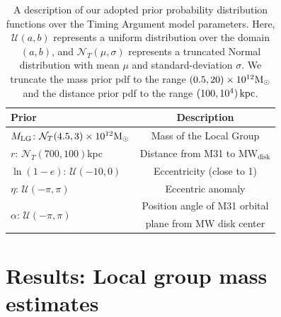 \documentclass[twocolumn]{aastex631}
\newcommand{\kc}[1]{\textcolor{pink}{\textbf{#1}} }
\newcommand{\mlg}{\ensuremath{M_{\rm LG}}}
\newcommand{\mwdisk}{\ensuremath{\textrm{MW}_\textrm{disk}}}
\begin{document}
\begin{table}
  \centering
  \begin{tabular}{lc}
  \hline\hline
  Prior  & Description \\\hline
  \mlg: $\mathcal{N}_T(4.5,3)\times10^{12}\mathrm{M}_\odot$ & Mass of the Local Group\\
  $r$: $\mathcal{N}_T(700,100)$kpc & Distance from M31 to $\mwdisk$\\
  $\ln(1-e)$: $\mathcal{U}(-10,0)$ & Eccentricity (close to 1) \\
  $\eta$: $\mathcal{U}(-\pi, \pi)$ & Eccentric anomaly\\
  \multirow{2}{*}{$\alpha$: $\mathcal{U}(-\pi, \pi)$} & Position angle of M31
  orbital\\
  & plane from MW disk center\\
  \hline\hline
  \end{tabular}
  \caption{\label{table:priors} A description of our adopted prior probability
  distribution functions over the Timing Argument model parameters.
  Here, $\mathcal{U}(a, b)$ represents a uniform distribution over the domain
  $(a, b)$, and $\mathcal{N}_T(\mu, \sigma)$ represents a truncated Normal
  distribution with mean $\mu$ and standard-deviation $\sigma$.
  We truncate the mass prior pdf to the range $(0.5, 20)\times10^{12} \mathrm{M}_\odot$ and
  the distance prior pdf to the range $(100, 10^{4})\,\mathrm{kpc}$.
  }
\end{table}


\section{Results: Local group mass estimates}
\label{sec:results}
\end{document}
